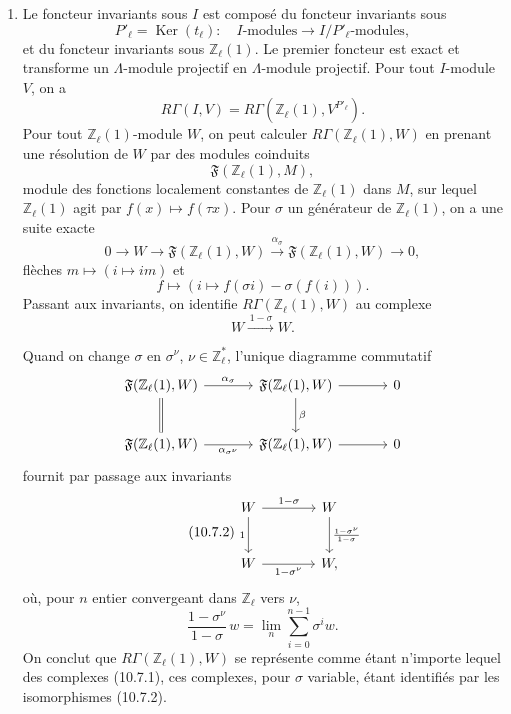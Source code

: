 \documentclass[10pt]{article}
\newcommand{\Z}{\mathbb Z}
\providecommand{\Ker}{\operatorname{Ker}}
\providecommand{\Ker}{\operatorname{Ker}}
\begin{document}
\begin{enumerate}[label=(\alph*)]
\item Le foncteur invariants sous \(I\) est composé du foncteur invariants sous
\[
P'_\ell=\Ker(t_\ell):
\quad I\text{-modules}\longrightarrow I/P'_\ell\text{-modules},
\]
et du foncteur invariants sous \(\Z_\ell(1)\). Le premier foncteur est exact et transforme un \(\Lambda\)-module projectif en \(\Lambda\)-module projectif. Pour tout \(I\)-module \(V\), on a
\[
R\Gamma(I,V)=R\Gamma(\Z_\ell(1),V^{P'_\ell}).
\]
Pour tout \(\Z_\ell(1)\)-module \(W\), on peut calculer \(R\Gamma(\Z_\ell(1),W)\) en prenant une résolution de \(W\) par des modules coinduits
\[
\mathfrak F(\Z_\ell(1),M),
\]
module des fonctions localement constantes de \(\Z_\ell(1)\) dans \(M\), sur lequel \(\Z_\ell(1)\) agit par \(f(x)\mapsto f(\tau x)\). Pour \(\sigma\) un générateur de \(\Z_\ell(1)\), on a une suite exacte
\[
0\longrightarrow W\longrightarrow\mathfrak F(\Z_\ell(1),W)
\xrightarrow{\alpha_\sigma}
\mathfrak F(\Z_\ell(1),W)\longrightarrow0,
\]
flèches \(m\mapsto(i\mapsto im)\) et
\[
f\longmapsto(i\mapsto f(\sigma i)-\sigma(f(i))).
\]
Passant aux invariants, on identifie \(R\Gamma(\Z_\ell(1),W)\) au complexe
\[
\tag{10.7.1}
W\xrightarrow{\,1-\sigma\,}W.
\]

Quand on change \(\sigma\) en \(\sigma^\nu\), \(\nu\in\Z_\ell^*\), l'unique diagramme commutatif
\[
\begin{tikzcd}[column sep=3.5em,row sep=2.5em]
\mathfrak F(\Z_\ell(1),W)\arrow[r,"\alpha_\sigma"]\arrow[d,equal]&
\mathfrak F(\Z_\ell(1),W)\arrow[r]\arrow[d,"\beta"]&0\\
\mathfrak F(\Z_\ell(1),W)\arrow[r,"\alpha_{\sigma^\nu}"']&
\mathfrak F(\Z_\ell(1),W)\arrow[r]&0
\end{tikzcd}
\]
fournit par passage aux invariants
\[
\tag{10.7.2}
\begin{tikzcd}[column sep=3.8em,row sep=2.6em]
W\arrow[r,"1-\sigma"]\arrow[d,"1"']&
W\arrow[d,"\frac{1-\sigma^\nu}{1-\sigma}"]\\
W\arrow[r,"1-\sigma^\nu"']&W ,
\end{tikzcd}
\]
où, pour \(n\) entier convergeant dans \(\Z_\ell\) vers \(\nu\),
\[
\tag{10.7.3}
\frac{1-\sigma^\nu}{1-\sigma}\,w
=
\lim_n\sum_{i=0}^{n-1}\sigma^iw.
\]
On conclut que \(R\Gamma(\Z_\ell(1),W)\) se représente comme étant n'importe lequel des complexes (10.7.1), ces complexes, pour \(\sigma\) variable, étant identifiés par les isomorphismes (10.7.2).


\end{enumerate}
\end{document}
